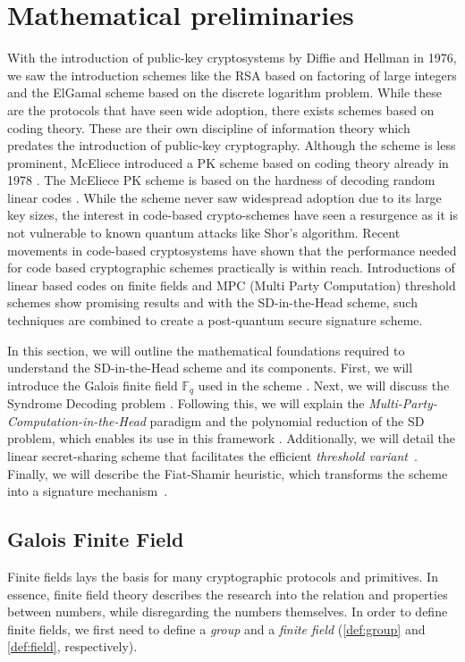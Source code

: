 \documentclass[twoside,11pt,openright]{report}
\theoremstyle{definition}
\theoremstyle{plain}
\begin{document}
\chapter{Mathematical preliminaries}
\label{ch:mathprelim}

With the introduction of public-key cryptosystems by Diffie and Hellman in 1976, we saw the introduction schemes like the RSA based on factoring of large integers and the ElGamal scheme based on the discrete logarithm problem. While these are the protocols that have seen wide adoption, there exists schemes based on coding theory. These are their own discipline of information theory which predates the introduction of public-key cryptography. Although the scheme is less prominent, McEliece introduced a PK scheme based on coding theory already in 1978 \cite{mceliece1978public}. The McEliece PK scheme is based on the hardness of decoding random linear codes \cite{berlekamp1978inherent}. While the scheme never saw widespread adoption due to its large key sizes, the interest in code-based crypto-schemes have seen a resurgence as it is not vulnerable to known quantum attacks like Shor's algorithm. Recent movements in code-based cryptosystems have shown that the performance needed for code based cryptographic schemes practically is within reach. Introductions of linear based codes on finite fields and MPC (Multi Party Computation) threshold schemes \cite{baum2020concretely} show promising results and with the SD-in-the-Head scheme, such techniques are combined to create a post-quantum secure signature scheme.

In this section, we will outline the mathematical foundations required to understand the SD-in-the-Head scheme and its components. First, we will introduce the Galois finite field $\mathbb{F}_q$ used in the scheme \cite{martinez2023syndromes, reed1960polynomial, brownadvanced}. Next, we will discuss the Syndrome Decoding problem \cite{aguilarsyndrome11, mceliece1978public, berlekamp1978inherent, baldi2013optimization}. Following this, we will explain the \textit{Multi-Party-Computation-in-the-Head} paradigm and the polynomial reduction of the SD problem, which enables its use in this framework \cite{baum2020concretely}. Additionally, we will detail the linear secret-sharing scheme that facilitates the efficient \textit{threshold variant}~\cite{feneuil2023threshold}. Finally, we will describe the Fiat-Shamir heuristic, which transforms the scheme into a signature mechanism~\cite{fiat1986prove}. 

\section{Galois Finite Field}
\label{sec:gf256}
Finite fields lays the basis for many cryptographic protocols and primitives. In essence, finite field theory describes the research into the relation and properties between numbers, while disregarding the numbers themselves. In order to define finite fields, we first need to define a \textit{group} and a \textit{finite field} (\autoref{def:group} and \autoref{def:field}, respectively).
\end{document}
